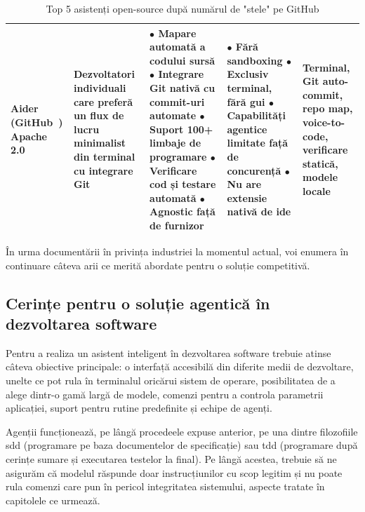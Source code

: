 \documentclass[12pt, a4paper, oneside, romanian]{teza-upb}
\begin{document}
\begin{table}[H]
\begin{tabularx}{\textwidth}{@{} >{\hsize=0.5\hsize\RaggedRight}X >{\hsize=0.7\hsize\RaggedRight}X >{\hsize=1.1\hsize\RaggedRight}X >{\hsize=1.1\hsize\RaggedRight}X >{\hsize=0.6\hsize\RaggedRight}X @{}}
      \textbf{Aider} \newline (GitHub~\cite{gh_aider}) \newline Apache 2.0 &
      Dezvoltatori individuali care preferă un flux de lucru minimalist din terminal cu integrare Git~\cite{web_git} &
      $\bullet$ Mapare automată a codului sursă\newline
      $\bullet$ Integrare Git nativă cu commit-uri automate\newline
      $\bullet$ Suport 100+ limbaje de programare\newline
      $\bullet$ Verificare cod și testare automată\newline
      $\bullet$ Agnostic față de furnizor &
      $\bullet$ Fără sandboxing\newline
      $\bullet$ Exclusiv terminal, fără \ac{gui}\newline
      $\bullet$ Capabilități agentice limitate față de concurență\newline
      $\bullet$ Nu are extensie nativă de \ac{ide} &
      Terminal, Git auto-commit, repo map, voice-to-code, verificare statică, modele locale \\
      \bottomrule
    \end{tabularx}
  \caption{Top 5 asistenți open-source după numărul de "stele" pe GitHub}
  \label{tab:asistenti_opensource}
  \end{table}

  În urma documentării în privința industriei la momentul actual, voi enumera în continuare câteva arii ce merită abordate pentru o soluție competitivă.

  \subsection{Cerințe pentru o soluție agentică în dezvoltarea software}

  Pentru a realiza un asistent inteligent în dezvoltarea software trebuie atinse câteva obiective principale: o interfață accesibilă din diferite medii de dezvoltare, unelte ce pot rula în terminalul oricărui sistem de operare, posibilitatea de a alege dintr-o gamă largă de modele, comenzi pentru a controla parametrii aplicației, suport pentru rutine predefinite și echipe de agenți.

  Agenții funcționează, pe lângă procedeele expuse anterior, pe una dintre filozofiile \ac{sdd} (programare pe baza documentelor de specificație) sau \ac{tdd} (programare după cerințe sumare și executarea testelor la final). Pe lângă acestea, trebuie să ne asigurăm că modelul răspunde doar instrucțiunilor cu scop legitim și nu poate rula comenzi care pun în pericol integritatea sistemului, aspecte tratate în capitolele ce urmează.
\end{document}
